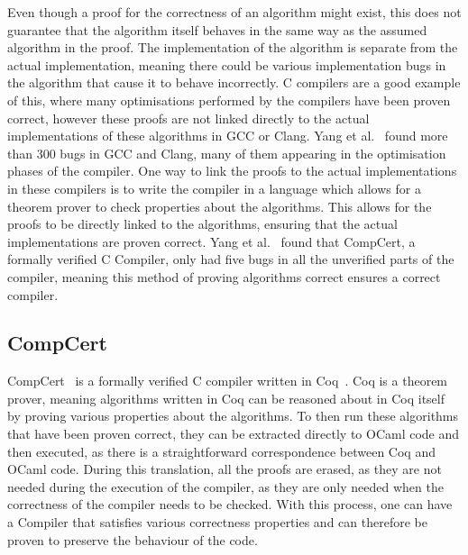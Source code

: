 Even though a proof for the correctness of an algorithm might exist, this does not guarantee that
the algorithm itself behaves in the same way as the assumed algorithm in the proof.  The
implementation of the algorithm is separate from the actual implementation, meaning there could be
various implementation bugs in the algorithm that cause it to behave incorrectly.  C compilers are a
good example of this, where many optimisations performed by the compilers have been proven correct,
however these proofs are not linked directly to the actual implementations of these algorithms in
GCC or Clang.  Yang et al.~\cite{yang11_findin_under_bugs_c_compil} found more than 300 bugs in GCC
and Clang, many of them appearing in the optimisation phases of the compiler.  One way to link the
proofs to the actual implementations in these compilers is to write the compiler in a language which
allows for a theorem prover to check properties about the algorithms.  This allows for the proofs to
be directly linked to the algorithms, ensuring that the actual implementations are proven correct.
Yang et al.~\cite{yang11_findin_under_bugs_c_compil} found that CompCert, a formally verified C
Compiler, only had five bugs in all the unverified parts of the compiler, meaning this method of
proving algorithms correct ensures a correct compiler.

\subsection{CompCert}

CompCert~\cite{leroy09_formal_verif_compil_back_end} is a formally verified C
compiler written in Coq~\cite{bertot04_inter_theor_provin_progr_devel}.  Coq is a theorem prover,
meaning algorithms written in Coq can be reasoned about in Coq itself by proving various properties
about the algorithms.  To then run these algorithms that have been proven correct, they can be
extracted directly to OCaml code and then executed, as there is a straightforward correspondence
between Coq and OCaml code.  During this translation, all the proofs are erased, as they are not
needed during the execution of the compiler, as they are only needed when the correctness of the
compiler needs to be checked.  With this process, one can have a Compiler that satisfies various
correctness properties and can therefore be proven to preserve the behaviour of the code.


